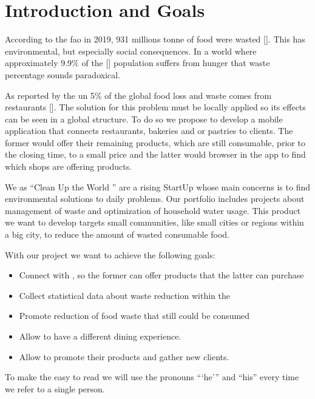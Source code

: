 \section{Introduction and Goals}

According to the \acrfull{fao} in 2019, 931 millions tonne of food were wasted [\cite{refart:FAOFW}]. This has
environmental, but especially social consequences. In a world where approximately 9.9\% of the [\cite{refart:AAHWH}]
population suffers from hunger that waste percentage sounds paradoxical.

As reported by the \acrfull{un} 5\% of the global food loss and waste comes from restaurants [\cite{refart:UNSP}]. 
The solution for this problem must be locally applied so its effects can be seen in a global structure. To do 
so we propose to develop a mobile application that connects restaurants, bakeries and or pastries to clients. The
former would offer their remaining products, which are still consumable, prior to the closing time, to a small price
and the latter would browser in the app to find which shops are offering products. 

We as ``Clean Up the World \textregistered'' are a rising StartUp whose main concerns is to find environmental solutions to
daily problems. Our portfolio includes projects about management of waste and optimization of household water 
usage. This product we want to develop targets small communities, like small cities or regions within a big city, 
to reduce the amount of wasted consumable food.

With our project we want to achieve the following goals:

\begin{itemize}
    \item Connect  with , so the former can offer products that the latter
    can purchase
    \item Collect statistical data about waste reduction within the 
    \item Promote reduction of food waste that still could be consumed
    \item Allow  to have a different dining experience.
    \item Allow  to promote their products and gather new clients.
\end{itemize}

To make the easy to read we will use the pronouns ```he''' and ``his'' every time we refer to a single person.

